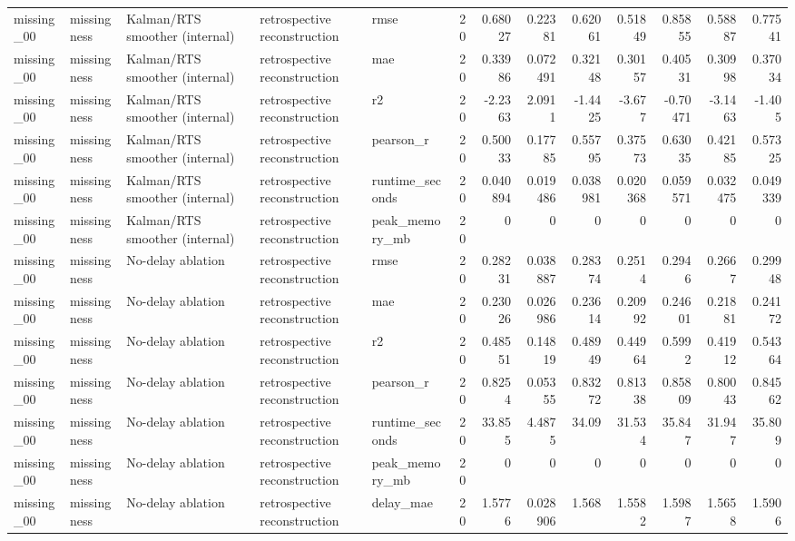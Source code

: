 \begin{table}[!htbp]
{{\begin{tabular}{lllllrrrrrrrr}
missing_00 & missingness & Kalman/RTS smoother (internal) & retrospective reconstruction & rmse & 20 & 0.68027 & 0.22381 & 0.62061 & 0.51849 & 0.85855 & 0.58887 & 0.77541 \\
missing_00 & missingness & Kalman/RTS smoother (internal) & retrospective reconstruction & mae & 20 & 0.33986 & 0.072491 & 0.32148 & 0.30157 & 0.40531 & 0.30998 & 0.37034 \\
missing_00 & missingness & Kalman/RTS smoother (internal) & retrospective reconstruction & r2 & 20 & -2.2363 & 2.0911 & -1.4425 & -3.677 & -0.70471 & -3.1463 & -1.405 \\
missing_00 & missingness & Kalman/RTS smoother (internal) & retrospective reconstruction & pearson_r & 20 & 0.50033 & 0.17785 & 0.55795 & 0.37573 & 0.63035 & 0.42185 & 0.57325 \\
missing_00 & missingness & Kalman/RTS smoother (internal) & retrospective reconstruction & runtime_seconds & 20 & 0.040894 & 0.019486 & 0.038981 & 0.020368 & 0.059571 & 0.032475 & 0.049339 \\
missing_00 & missingness & Kalman/RTS smoother (internal) & retrospective reconstruction & peak_memory_mb & 20 & 0 & 0 & 0 & 0 & 0 & 0 & 0 \\
missing_00 & missingness & No-delay ablation & retrospective reconstruction & rmse & 20 & 0.28231 & 0.038887 & 0.28374 & 0.2514 & 0.2946 & 0.2667 & 0.29948 \\
missing_00 & missingness & No-delay ablation & retrospective reconstruction & mae & 20 & 0.23026 & 0.026986 & 0.23614 & 0.20992 & 0.24601 & 0.21881 & 0.24172 \\
missing_00 & missingness & No-delay ablation & retrospective reconstruction & r2 & 20 & 0.48551 & 0.14819 & 0.48949 & 0.44964 & 0.5992 & 0.41912 & 0.54364 \\
missing_00 & missingness & No-delay ablation & retrospective reconstruction & pearson_r & 20 & 0.8254 & 0.05355 & 0.83272 & 0.81338 & 0.85809 & 0.80043 & 0.84562 \\
missing_00 & missingness & No-delay ablation & retrospective reconstruction & runtime_seconds & 20 & 33.855 & 4.4875 & 34.09 & 31.534 & 35.847 & 31.947 & 35.809 \\
missing_00 & missingness & No-delay ablation & retrospective reconstruction & peak_memory_mb & 20 & 0 & 0 & 0 & 0 & 0 & 0 & 0 \\
missing_00 & missingness & No-delay ablation & retrospective reconstruction & delay_mae & 20 & 1.5776 & 0.028906 & 1.568 & 1.5582 & 1.5987 & 1.5658 & 1.5906 \\

\end{tabular}}}
\end{table}
